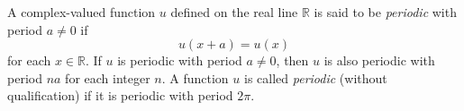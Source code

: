 A complex-valued function $u$ defined on the real line $\mathbb{R}$ is said to be \emph{periodic} with period $a \neq 0$ if
$$u(x + a) = u(x)$$
for each $x \in \mathbb{R}$. If $u$ is periodic with period $a \neq 0$, then $u$ is also periodic with period $na$ for each integer $n$. A function $u$ is called \emph{periodic} (without qualification) if it is periodic with period $2\pi$.
